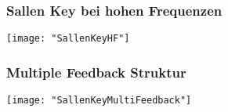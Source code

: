 
\subsubsection{Sallen Key bei hohen Frequenzen}
\begin{minipage}[t]{0.3\textwidth}
	\vspace{0pt}
	\texttt{[image: "SallenKeyHF"]}
\end{minipage}\hspace{0.05\textwidth}
\begin{minipage}[t]{0.3\textwidth}
	\vspace{0pt}
\end{minipage}
\begin{minipage}[t]{0.3\textwidth}
	\vspace{0pt}
	
\end{minipage}
\vspace{2mm}



\subsubsection{Multiple Feedback Struktur}
\begin{minipage}[t]{0.3\textwidth}
	\vspace{0pt}
	\texttt{[image: "SallenKeyMultiFeedback"]}
\end{minipage}\hspace{0.05\textwidth}
\begin{minipage}[t]{0.3\textwidth}
	\vspace{0pt}
	\\
\end{minipage}
\begin{minipage}[t]{0.3\textwidth}
	\vspace{0pt}
	
\end{minipage}
\vspace{2mm}


